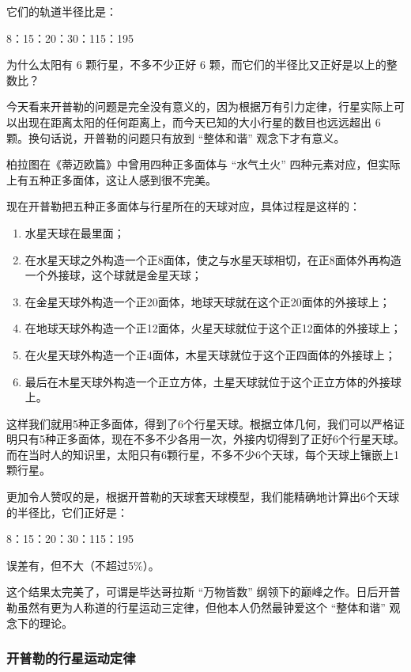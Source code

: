 它们的轨道半径比是：

8：15：20：30：115：195

为什么太阳有 6 颗行星，不多不少正好 6 颗，而它们的半径比又正好是以上的整数比？

今天看来开普勒的问题是完全没有意义的，因为根据万有引力定律，行星实际上可以出现在距离太阳的任何距离上，而今天已知的大小行星的数目也远远超出 6 颗。换句话说，开普勒的问题只有放到 “整体和谐” 观念下才有意义。

柏拉图在《蒂迈欧篇》中曾用四种正多面体与 “水气土火” 四种元素对应，但实际上有五种正多面体，这让人感到很不完美。

现在开普勒把五种正多面体与行星所在的天球对应，具体过程是这样的：

\begin{enumerate}
\item 水星天球在最里面；

\item 在水星天球之外构造一个正8面体，使之与水星天球相切，在正8面体外再构造一个外接球，这个球就是金星天球；

\item 在金星天球外构造一个正20面体，地球天球就在这个正20面体的外接球上；

\item 在地球天球外构造一个正12面体，火星天球就位于这个正12面体的外接球上；

\item 在火星天球外构造一个正4面体，木星天球就位于这个正四面体的外接球上；

\item 最后在木星天球外构造一个正立方体，土星天球就位于这个正立方体的外接球上。
\end{enumerate}

这样我们就用5种正多面体，得到了6个行星天球。根据立体几何，我们可以严格证明只有5种正多面体，现在不多不少各用一次，外接内切得到了正好6个行星天球。而在当时人的知识里，太阳只有6颗行星，不多不少6个天球，每个天球上镶嵌上1颗行星。

更加令人赞叹的是，根据开普勒的天球套天球模型，我们能精确地计算出6个天球的半径比，它们正好是：

8：15：20：30：115：195

误差有，但不大（不超过5\%）。

这个结果太完美了，可谓是毕达哥拉斯 “万物皆数” 纲领下的巅峰之作。日后开普勒虽然有更为人称道的行星运动三定律，但他本人仍然最钟爱这个 “整体和谐” 观念下的理论。


\subsubsection{开普勒的行星运动定律}

